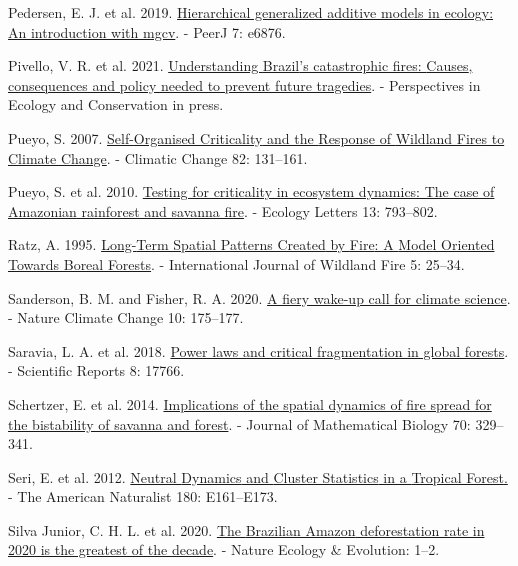 \documentclass[
]{article}
\newlength{\cslhangindent}
\newenvironment{CSLReferences}[2] %
 {\begin{list}{}{%
  \setlength{\itemindent}{0pt}
  \setlength{\leftmargin}{0pt}
  \setlength{\parsep}{0pt}
  \ifodd #1
   \setlength{\leftmargin}{\cslhangindent}
   \setlength{\itemindent}{-1\cslhangindent}
  \fi
  \setlength{\itemsep}{#2\baselineskip}}}
 {\end{list}}
\begin{document}
\begin{CSLReferences}{1}{1}
Pedersen, E. J. et al. 2019.
\href{https://doi.org/10.7717/peerj.6876}{Hierarchical generalized
additive models in ecology: An introduction with mgcv}. - PeerJ 7:
e6876.

Pivello, V. R. et al. 2021.
\href{https://doi.org/10.1016/j.pecon.2021.06.005}{Understanding
{Brazil}'s catastrophic fires: {Causes}, consequences and policy needed
to prevent future tragedies}. - Perspectives in Ecology and Conservation
in press.

Pueyo, S. 2007.
\href{https://doi.org/10.1007/s10584-006-9134-2}{Self-{Organised
Criticality} and the {Response} of {Wildland Fires} to {Climate
Change}}. - Climatic Change 82: 131--161.

Pueyo, S. et al. 2010.
\href{https://doi.org/10.1111/j.1461-0248.2010.01497.x}{Testing for
criticality in ecosystem dynamics: The case of {Amazonian} rainforest
and savanna fire}. - Ecology Letters 13: 793--802.

Ratz, A. 1995. \href{https://doi.org/10.1071/wf9950025}{Long-{Term
Spatial Patterns Created} by {Fire}: A {Model Oriented Towards Boreal
Forests}}. - International Journal of Wildland Fire 5: 25--34.

Sanderson, B. M. and Fisher, R. A. 2020.
\href{https://doi.org/10.1038/s41558-020-0707-2}{A fiery wake-up call
for climate science}. - Nature Climate Change 10: 175--177.

Saravia, L. A. et al. 2018.
\href{https://doi.org/10.1038/s41598-018-36120-w}{Power laws and
critical fragmentation in global forests}. - Scientific Reports 8:
17766.

Schertzer, E. et al. 2014.
\href{https://doi.org/10.1007/s00285-014-0757-z}{Implications of the
spatial dynamics of fire spread for the bistability of savanna and
forest}. - Journal of Mathematical Biology 70: 329--341.

Seri, E. et al. 2012. \href{https://doi.org/10.1086/668125}{Neutral
{Dynamics} and {Cluster Statistics} in a {Tropical Forest}.} - The
American Naturalist 180: E161--E173.

Silva Junior, C. H. L. et al. 2020.
\href{https://doi.org/10.1038/s41559-020-01368-x}{The {Brazilian Amazon}
deforestation rate in 2020 is the greatest of the decade}. - Nature
Ecology \& Evolution: 1--2.


\end{CSLReferences}
\end{document}
